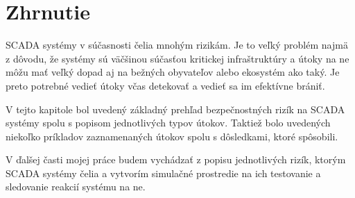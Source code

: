 \section{Zhrnutie}
SCADA systémy v súčasnosti čelia mnohým rizikám. Je to veľký problém najmä z dôvodu, že systémy sú väčšinou súčasťou kritickej infraštruktúry a útoky na ne môžu mať veľký dopad aj na bežných obyvateľov alebo ekosystém ako taký. Je preto potrebné vedieť útoky včas detekovať a vedieť sa im efektívne brániť. \par
V tejto kapitole bol uvedený základný prehľad bezpečnostných rizík na SCADA systémy spolu s popisom jednotlivých typov útokov. Taktiež bolo uvedených niekoľko príkladov zaznamenaných útokov spolu s dôsledkami, ktoré spôsobili. \par
V ďalšej časti mojej práce budem vychádzať z popisu jednotlivých rizík, ktorým SCADA systémy čelia a vytvorím simulačné prostredie na ich testovanie a sledovanie reakcií systému na ne.




